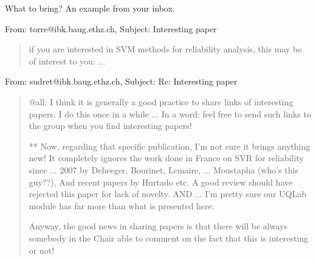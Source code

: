 \documentclass[]{rsuqbeamernew}
\begin{document}
\begin{frame}[t]{What to bring? An example from your inbox.}

From: torre$@$ibk.baug.ethz.ch, Subject: Interesting paper

\begin{quotation}
  
 if you are interested in SVM methods for reliability analysis, this may
 be of interest to you: ...
 
\end{quotation}

From: sudret$@$ibk.baug.ethz.ch, Subject: Re: Interesting paper

\begin{quotation}

  @all: I think it is generally a good practice to share links of interesting papers.
  I do this once in a while ... In a word: feel free to send such links to the group when you find interesting papers!
  
  ** Now, regarding that specific publication, I'm not sure it brings anything new! It completely ignores the work done in France on SVR for reliability since ... 2007 by Deheeger, Bourinet, Lemaire, ... Moustapha (who's this guy??), And recent papers by Hurtado etc.
  A good review should have rejected this paper for lack of novelty. AND ... I'm pretty sure our UQLab module has far more than what is presented here.
  
  Anyway, the good news in sharing papers is that there will be always somebody in the Chair able to comment on the fact that this is interesting or not!
\end{quotation}
  
\end{frame}
\end{document}
